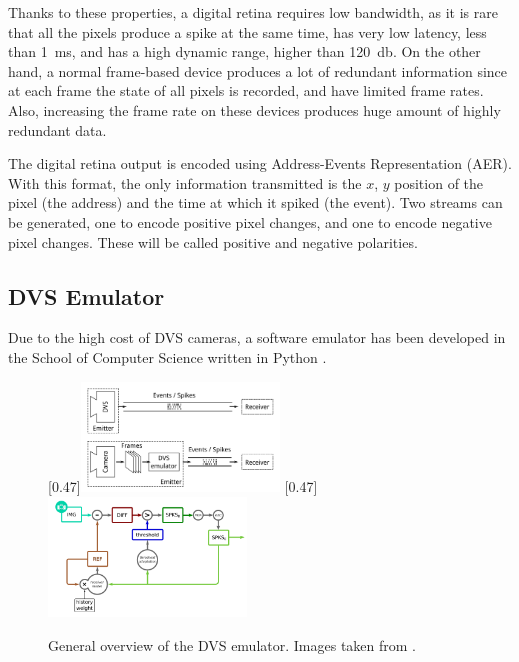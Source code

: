 Thanks to these properties, a digital retina requires low bandwidth, as it is rare that all the pixels produce a spike at the same time, has very low latency, less than \SI{1}{\milli\second}, and has a high dynamic range, higher than \SI{120}{\decibel}. On the other hand, a normal frame-based device produces a lot of redundant information since at each frame the state of all pixels is recorded, and have limited frame rates. Also, increasing the frame rate on these devices produces huge amount of highly redundant data.

The digital retina output is encoded using Address-Events Representation (AER). With this format, the only information transmitted is the $x$, $y$ position of the pixel (the address) and the time at which it spiked (the event). Two streams can be generated, one to encode positive pixel changes, and one to encode negative pixel changes. These will be called positive and negative polarities.  


\subsection{DVS Emulator}
Due to the high cost of DVS cameras, a software emulator has been developed in the School of Computer Science written in Python \cite{Garcia2017}.

\begin{figure}[ht]
\centering
{}
  [0.47\textwidth]{\includegraphics[width=0.47\textwidth]{images/context/dvs_comparison.png}}
  [0.47\textwidth]{\includegraphics[width=0.47\textwidth]{images/context/dvs_diagram.png}}
\caption[DVS Emulator]{General overview of the DVS emulator. Images taken from \cite{Garcia2017}.}
\label{fig:dvs_emulator}
\end{figure}

